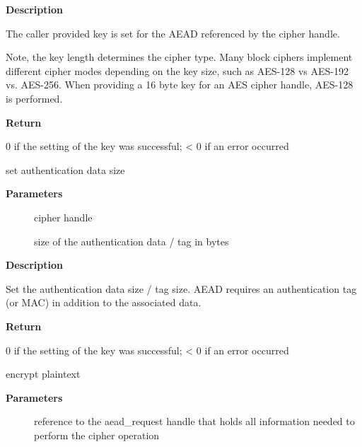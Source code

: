 \documentclass[a4paper,8pt,english]{sphinxmanual}
\begin{document}
\textbf{Description}

The caller provided key is set for the AEAD referenced by the cipher
handle.

Note, the key length determines the cipher type. Many block ciphers implement
different cipher modes depending on the key size, such as AES-128 vs AES-192
vs. AES-256. When providing a 16 byte key for an AES cipher handle, AES-128
is performed.

\textbf{Return}

0 if the setting of the key was successful; \textless{} 0 if an error occurred

\begin{fulllineitems}
\label{crypto/api-aead:c.crypto_aead_setauthsize}
set authentication data size

\end{fulllineitems}


\textbf{Parameters}
\begin{description}
\item[{}] \leavevmode
cipher handle

\item[{}] \leavevmode
size of the authentication data / tag in bytes

\end{description}

\textbf{Description}

Set the authentication data size / tag size. AEAD requires an authentication
tag (or MAC) in addition to the associated data.

\textbf{Return}

0 if the setting of the key was successful; \textless{} 0 if an error occurred

\begin{fulllineitems}
\label{crypto/api-aead:c.crypto_aead_encrypt}
encrypt plaintext

\end{fulllineitems}


\textbf{Parameters}
\begin{description}
\item[{}] \leavevmode
reference to the aead\_request handle that holds all information
needed to perform the cipher operation

\end{description}
\end{document}
